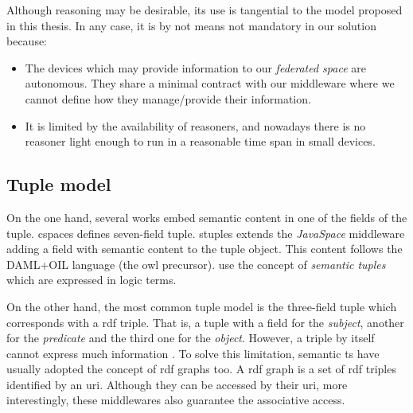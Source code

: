 Although reasoning may be desirable, its use is tangential to the model proposed in this thesis.
In any case, it is by not means not mandatory in our solution because:
\begin{itemize}
  \item The devices which may provide information to our \emph{federated space} are autonomous.
	They share a minimal contract with our middleware where we cannot define how they manage/provide their information.
  \item It is limited by the availability of reasoners, and nowadays there is no reasoner light enough to run in a reasonable time span in small devices.
\end{itemize}




\subsection{Tuple model}

On the one hand, several works embed semantic content in one of the fields of the tuple.
\ac{cspaces} \citep{martinrecuerda_towards_2005} defines seven-field tuple.
\ac{stuples}\citep{khushraj_stuples:_2004} extends the \emph{JavaSpace} \citep{freeman_javaspaces_1999} middleware adding a field with semantic content to the tuple object.
This content follows the DAML+OIL language (the \ac{owl} precursor).
\citet{nardini_semantic_2013} use the concept of \emph{semantic tuples} which are expressed in logic terms.


On the other hand, the most common tuple model is the three-field tuple which corresponds with a \ac{rdf} triple.
That is, a tuple with a field for the \emph{subject}, another for the \emph{predicate} and the third one for the \emph{object}.
However, a triple by itself cannot express much information \citep{krummenacher2006specification}.
To solve this limitation, semantic \ac{ts} have usually adopted the concept of \ac{rdf} graphs too.
A \ac{rdf} graph is a set of \ac{rdf} triples identified by an \ac{uri}. %
Although they can be accessed by their \ac{uri}, more interestingly, these middlewares also guarantee the associative access. %

